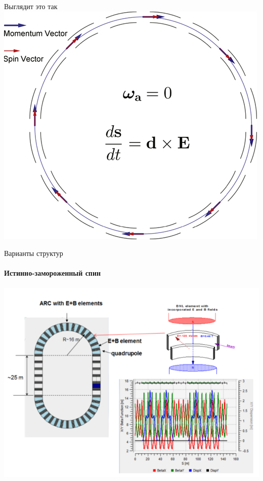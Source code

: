 \documentclass[14pt]{beamer}
\begin{document}
\begin{frame}{Выглядит это так}
	\centering
	\includegraphics[width=.7\linewidth]{FS_ring} %
\end{frame}

\begin{frame}{Варианты структур}
	\framesubtitle{Истинно-замороженный спин}
	\centering
	\includegraphics[width=.8\linewidth]{chapter2/BNL_lattice}
\end{frame}
\end{document}
